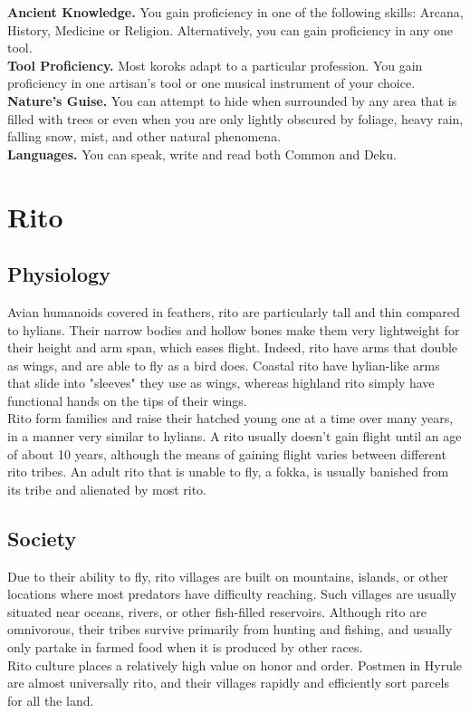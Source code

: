\documentclass[10pt,twoside,twocolumn,openany]{book}
\begin{document}
\indent \textbf{Ancient Knowledge.} You gain proficiency in one of the following skills: Arcana, History, Medicine or Religion. Alternatively, you can gain proficiency in any one tool.\\
\indent \textbf{Tool Proficiency.} Most koroks adapt to a particular profession. You gain proficiency in one artisan's tool or one musical instrument of your choice.\\
\indent \textbf{Nature's Guise.} You can attempt to hide when surrounded by any area that is filled with trees or even when you are only lightly obscured by foliage, heavy rain, falling snow, mist, and other natural phenomena.\\
\indent \textbf{Languages.} You can speak, write and read both Common and Deku.

\newpage
\section{Rito}

\subsection{Physiology}
Avian humanoids covered in feathers, rito are particularly tall and thin compared to hylians. Their narrow bodies and hollow bones make them very lightweight for their height and arm span, which eases flight. Indeed, rito have arms that double as wings, and are able to fly as a bird does. Coastal rito have hylian-like arms that slide into "sleeves" they use as wings, whereas highland rito simply have functional hands on the tips of their wings.\\
Rito form families and raise their hatched young one at a time over many years, in a manner very similar to hylians. A rito usually doesn't gain flight until an age of about 10 years, although the means of gaining flight varies between different rito tribes. An adult rito that is unable to fly, a fokka, is usually banished from its tribe and alienated by most rito.

\subsection{Society}
Due to their ability to fly, rito villages are built on mountains, islands, or other locations where most predators have difficulty reaching. Such villages are usually situated near oceans, rivers, or other fish-filled reservoirs. Although rito are omnivorous, their tribes survive primarily from hunting and fishing, and usually only partake in farmed food when it is produced by other races.\\
Rito culture places a relatively high value on honor and order. Postmen in Hyrule are almost universally rito, and their villages rapidly and efficiently sort parcels for all the land.
\end{document}
